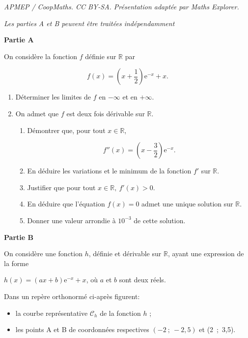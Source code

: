 \documentclass[10pt]{article}
\providecommand{\R}{\mathbb{R}}
\providecommand{\e}{{\mathrm{e}}}
\begin{document}
\noindent\textit{APMEP / CoopMaths. CC BY-SA. Présentation adaptée par Maths Explorer.}\par\medskip
\medskip

\emph{Les parties A et B peuvent être traitées indépendamment}

\medskip
\textbf{Partie A}
\medskip

On considère la fonction $f$ définie sur $\R$ par

\[f(x) = \left(x + \dfrac12\right)\e^{-x} + x.\]

\medskip

\begin{enumerate}
\item Déterminer les limites de $f$ en $- \infty$ et en $+ \infty$.
\item On admet que $f$ est deux fois dérivable sur $\R$.
	\begin{enumerate}
		\item Démontrer que, pour tout $x \in \R$,
		
\[f''(x) = \left(x - \dfrac32\right) \e^{-x}.\]

		\item En déduire les variations et le minimum de la fonction $f'$ sur $\R$.
		\item Justifier que pour tout $x \in \R,\: f'(x) > 0$.
		\item En déduire que l'équation $f(x) = 0$ admet une unique solution sur $\R$.
		\item Donner une valeur arrondie à $10^{-3}$ de cette solution.
	\end{enumerate}
\end{enumerate}

\medskip
\textbf{Partie B}
\medskip

On considère une fonction $h$, définie et dérivable sur $\R$, ayant une expression de la forme 

\begin{center}$h(x)= (ax + b)\e^{-x} + x$, \:où $a$ et $b$\: sont deux réels.\end{center}

Dans un repère orthonormé ci-après figurent:

\begin{itemize}
\item[$\bullet$~~]la courbe représentative $\mathcal{C}_h$ de la fonction $h$ ;
\item[$\bullet$~~]les points A et B de coordonnées respectives $(-2~;~-2,5)$ et (2~;~3,5).
\end{itemize}
\end{document}

